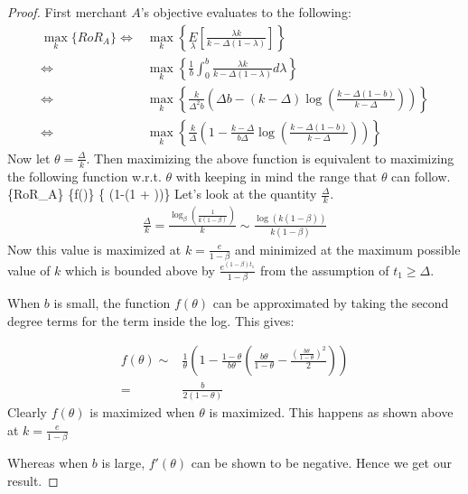 \begin{proof}
First merchant $A$'s objective evaluates to the following:
\begin{align*}
\underset{k}\max\{RoR_A\} \Leftrightarrow & \underset{k}\max\left\{\underset{\lambda}E\left[\frac{\lambda k}{k-\Delta(1-\lambda)}\right]\right\}\\
                          \Leftrightarrow & \underset{k}\max\left\{ \frac{1}{b}\int_{0}^{b} \frac{\lambda k}{k-\Delta(1-\lambda)}d\lambda \right\}\\
                          \Leftrightarrow & \underset{k}\max\left\{ \frac{k}{\Delta^2 b}\left(\Delta b - (k-\Delta)\log\left(\frac{k-\Delta(1-b)}{k-\Delta}\right)\right) \right\}\\
                          \Leftrightarrow & \underset{k} \max\left\{\frac{k}{\Delta}\left(1-\frac{k-\Delta}{b\Delta}\log\left(\frac{k-\Delta(1-b)}{k-\Delta}\right)\right)\right\}
\end{align*}
Now let $\theta = \frac{\Delta}{k}$. Then maximizing the above function is equivalent to maximizing the following function w.r.t. $\theta$ with keeping in mind the range that $\theta$ can follow.
\beq
{}\max\{RoR_A\} \Leftrightarrow \underset{\theta}\max\{f(\theta)\} \Leftrightarrow \underset{\theta}\max\left\{  \left(1-\log\left(1 + \right)\right)\right\} 
\eeq
Let's look at the quantity $\frac{\Delta}{k}$.
\begin{align*}
\frac{\Delta}{k} = \frac{\log_\beta\left(\frac{1}{k(1-\beta)}\right)}{k} \sim \frac{\log(k(1-\beta))}{k(1-\beta)} 
\end{align*}
Now this value is maximized at $k = \frac{e}{1-\beta}$ and minimized at the maximum possible value of $k$ which is bounded above by $\frac{e^{(1-\beta)t_1}}{1-\beta}$ from the assumption of $t_1 \ge \Delta$.

When $b$ is small, the function $f(\theta)$ can be approximated by taking the second degree terms for the term inside the log. This gives:

\begin{align*}
f(\theta) \sim & \frac{1}{\theta} \left(1-\frac{1-\theta}{b\theta}\left(\frac{b\theta}{1-\theta} - \frac{\left(\frac{b\theta}{1-\theta}\right)^2}{2}\right)\right)\\
          = & \frac{b}{2(1-\theta)}
\end{align*}
Clearly $f(\theta)$ is maximized when $\theta$ is maximized. This happens as shown above at $k = \frac{e}{1-\beta}$

Whereas when $b$ is large, $f'(\theta)$ can be shown to be negative. Hence we get our result.

\end{proof}

